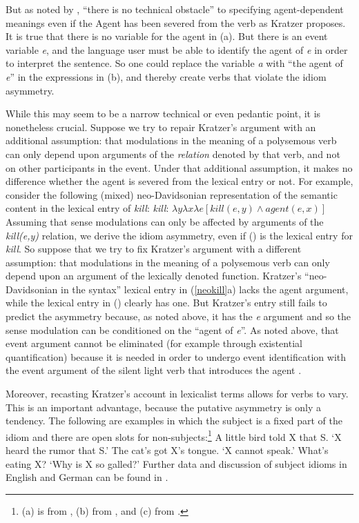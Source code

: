 But as noted by \citet{Wechsler2005a}, ``there is no technical obstacle'' to specifying
agent-dependent meanings even if the Agent has been severed from the verb as Kratzer proposes.  It
is true that there is no variable for the agent in (a).  But there is an event variable
\emph{e}, and the language user must be able to identify the agent of \emph{e} in order to interpret
the sentence.  So one could replace the variable \emph{a} with ``the agent of \emph{e}'' in the
expressions in (b), and thereby create verbs that violate the idiom asymmetry.

While this may seem to be a narrow technical or even pedantic point, it is nonetheless crucial.  Suppose we try to repair Kratzer's argument with an additional assumption: that modulations in the meaning of a polysemous verb can only depend upon arguments of the \emph{relation} denoted by that verb, and not on other participants in the event.  Under that additional assumption, it makes no difference whether the agent is severed from the lexical entry or not.   For example, consider the following (mixed) neo-Davidsonian representation of the semantic content in the lexical entry of \emph{kill}:    
\ea 
\emph{kill}: $\lambda y\lambda x\lambda e[kill(e,y) \wedge agent(e, x)]$ 
\z
Assuming that sense modulations can only be affected by arguments of the \emph{kill(e,y)} relation,
we derive the idiom asymmetry, even if () is the lexical entry for \emph{kill}.  So suppose
that we try to fix Kratzer's argument with a different assumption: that modulations in the meaning
of a polysemous verb can only depend upon an argument of the lexically denoted function.  Kratzer's
``neo-Davidsonian in the syntax'' lexical entry in (\ref{neokill}a) lacks the agent argument, while
the lexical entry in () clearly has one.  But Kratzer's entry still fails to predict the
asymmetry because, as noted above, it has the \emph{e} argument and so the sense modulation can be
conditioned on the ``agent of \emph{e}''.  As noted above, that event argument cannot be eliminated
(for example through existential quantification) because it is needed in order to undergo event
identification with the event argument of the silent light verb that introduces the agent
\citep[]{Kratzer96a}.

Moreover, recasting Kratzer's account in lexicalist terms allows for verbs to vary.  This is an
important advantage, because the putative asymmetry is only a tendency.  The following are examples
in which the subject is a fixed part of the idiom and there are open slots for
non-subjects:\footnote{%
(a) is from , (b) from , and
  (c) from .%
}
\eal
\ex\label{bird}
 A little bird told X that S.
\glt `X heard the rumor that S.'
\ex\label{cat-tounge}
The cat's got X's tongue.
\glt `X cannot speak.'   
\ex\label{what-is-eating-x}
What's eating X?
\glt `Why is X so galled?'
\zl
Further data and discussion of subject idioms in English and German can be found in .

